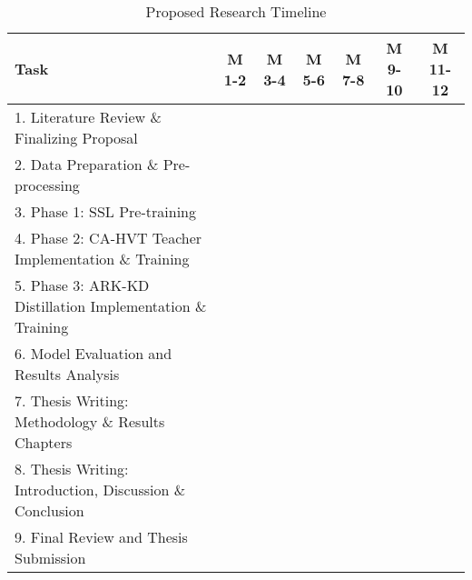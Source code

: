 \begin{table}[h!]
\centering
\caption{Proposed Research Timeline}
\label{tab:gantt}
\renewcommand{\arraystretch}{1.4}
\begin{adjustbox}{max width=\textwidth}
\begin{tabular}{| p{6cm} | c | c | c | c | c | c |}
\hline
\textbf{Task} & \textbf{M 1-2} & \textbf{M 3-4} & \textbf{M 5-6} & \textbf{M 7-8} & \textbf{M 9-10} & \textbf{M 11-12} \\
\hline
1. Literature Review \& Finalizing Proposal & \cellcolor{gray!40} & & & & & \\
\hline
2. Data Preparation \& Pre-processing & \cellcolor{gray!40} & & & & & \\
\hline
3. Phase 1: SSL Pre-training & & \cellcolor{gray!40} & & & & \\
\hline
4. Phase 2: CA-HVT Teacher Implementation \& Training & & & \cellcolor{gray!40} & & & \\
\hline
5. Phase 3: ARK-KD Distillation Implementation \& Training & & & & \cellcolor{gray!40} & & \\
\hline
6. Model Evaluation and Results Analysis & & & & & \cellcolor{gray!40} & \\
\hline
7. Thesis Writing: Methodology \& Results Chapters & & & & \cellcolor{gray!40} & \cellcolor{gray!40} & \\
\hline
8. Thesis Writing: Introduction, Discussion \& Conclusion & & & & & & \cellcolor{gray!40} \\
\hline
9. Final Review and Thesis Submission & & & & & & \cellcolor{gray!40} \\
\hline
\end{tabular}
\end{adjustbox}
\end{table}

